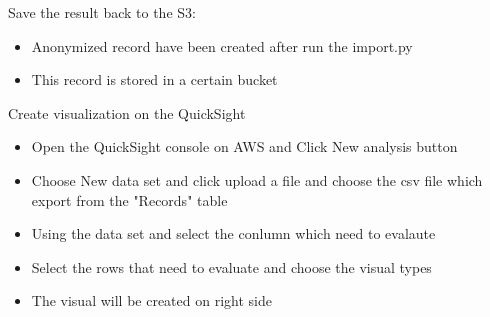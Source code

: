 \noindent Save the result back to the S3:
\begin{itemize}
	\item Anonymized record have been created after run the import.py 
    \item This record is stored in a certain bucket
\end{itemize}

\noindent Create visualization on the QuickSight
\begin{itemize}
	\item Open the QuickSight console on AWS and Click New analysis button
    \item Choose New data set and click upload a file and choose the csv file which export from the "Records" table
    \item Using the data set and select the conlumn which need to evalaute
    \item Select the rows that need to evaluate and choose the visual types
    \item The visual will be created on right side    
\end{itemize}



